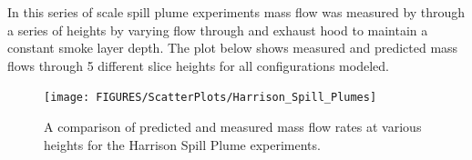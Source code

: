In this series of scale spill plume experiments mass flow was measured by through a series of heights by varying flow through and exhaust hood to maintain a constant smoke layer depth.  The plot below shows measured and predicted mass flows through 5 different slice heights for all configurations modeled.

\begin{figure}[h]
\begin{center}
\texttt{[image: FIGURES/ScatterPlots/Harrison\_Spill\_Plumes]}
\caption[Summary of Harrison Spill Plume predictions.]{A comparison of predicted and measured mass flow rates at various heights for the Harrison Spill Plume experiments.}
\label{Harrison_Scatterplot}
\end{center}
\end{figure}

\clearpage
